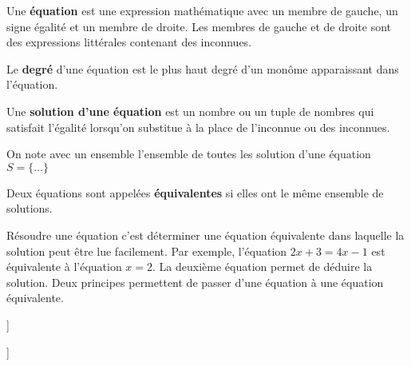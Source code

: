 \documentclass[a4paper,12pt]{report}
\begin{document}
\begin{defi}[équation]
	Une {\bfseries équation} est une expression mathématique avec un membre de gauche, un signe égalité et un membre de droite. Les membres de gauche et de droite sont des expressions littérales contenant des inconnues.
	\begin{center}
\end{center}
\end{defi}
\begin{defi}[degré]
	Le {\bfseries degré} d'une équation est le plus haut degré d'un monôme apparaissant dans l'équation.
\end{defi}
\begin{defi}
	Une {\bfseries solution d'une équation} est un nombre ou un tuple de nombres qui satisfait l'égalité lorsqu'on substitue à la place de l'inconnue ou des inconnues.
\end{defi}
\begin{boiteExT}
\vspace{6cm}

\end{boiteExT}
On note avec un ensemble l'ensemble de toutes les solution d'une équation $S=\{\ldots\}$ 
\begin{defi}
	Deux équations sont appelées {\bfseries équivalentes} si elles ont le même ensemble de solutions. 
\end{defi}
\begin{boiteExT}
\vspace{5cm}

\end{boiteExT}
Résoudre une équation c'est déterminer une équation équivalente dans laquelle la solution peut être lue facilement. Par exemple, l'équation $2x+3=4x-1$ est équivalente à l'équation $x=2$. La deuxième équation permet de déduire la solution. Deux principes permettent de passer d'une équation à une équation équivalente.
\begin{boiteExT}[Principe d'équivalence 1 [PE1]]
\vspace{8cm}

\end{boiteExT}
\begin{boiteExT}[Principe d'équivalence 2 [PE2]]
\vspace{8cm}

\end{boiteExT}
\end{document}
